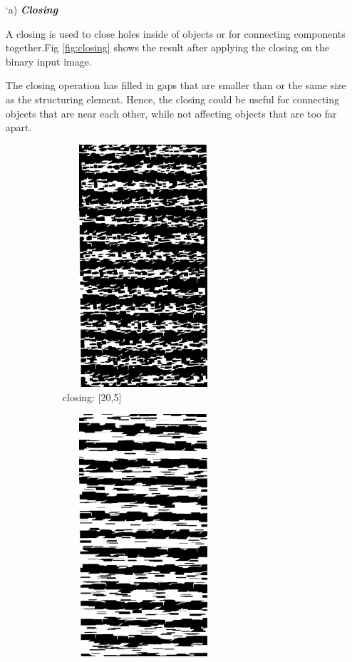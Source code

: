 \begin{itemize}
        \item[\char `a)] \textit{\textbf{Closing}}
         
         A closing is used to close holes inside of objects or for connecting components together.Fig \ref{fig:closing} shows the result after applying the closing on the binary input  image.
         
         The closing operation has filled in gaps that are smaller than or the same size as the structuring element. Hence, the closing could be useful for connecting objects that are near each other, while not affecting objects that are too far apart.

        \begin{figure}[!htb]
             \centering
             \begin{subfigure}[b]{0.4\textwidth}
                 \centering
                 \includegraphics[width=6cm, height=9cm]{images/clos1.png}
                 \caption{closing: [20,5]}
                 \label{fig:close1}
             \end{subfigure}
             \hfill
             \begin{subfigure}[b]{0.4\textwidth}
                 \centering
                 \includegraphics[width=6cm, height=9cm]{images/clos2.png}

\end{subfigure}
\end{figure}
\end{itemize}
